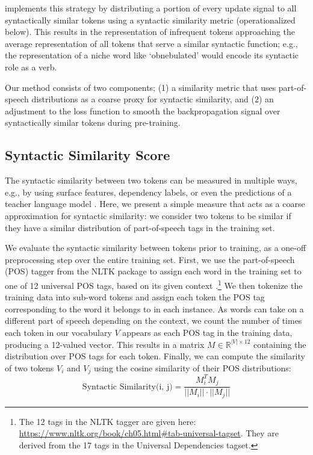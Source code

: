 \smoothing implements this strategy by distributing a portion of every update signal to all syntactically similar tokens using a syntactic similarity metric (operationalized below). This results in the representation of infrequent tokens approaching the average representation of all tokens that serve a similar syntactic function; e.g., the representation of a niche word like `obnebulated' would encode its syntactic role as a verb.

Our method consists of two components; (1) a similarity metric that uses part-of-speech distributions as a coarse proxy for syntactic similarity, and (2) an adjustment to the loss function to smooth the backpropagation signal over syntactically similar tokens during pre-training. 

\subsection{Syntactic Similarity Score}\label{sec:sim}

The syntactic similarity between two tokens can be measured in multiple ways, e.g., by using surface features, dependency labels, or even the predictions of a teacher language model \citep{hinton2015distilling}. Here, we present a simple measure that acts as a coarse approximation for syntactic similarity: we consider two tokens to be similar if they have a similar distribution of part-of-speech tags in the training set.

We evaluate the syntactic similarity between tokens prior to training, as a one-off preprocessing step over the entire training set. First, we use the part-of-speech (POS) tagger from the NLTK package \citep{bird2009natural} to assign each word in the training set to one of 12 universal POS tags, based on its given context \citep{petrov2012universalpos}.\footnote{The 12 tags in the NLTK tagger are given here: \url{https://www.nltk.org/book/ch05.html\#tab-universal-tagset}. They are derived from the 17 tags in the Universal Dependencies tagset.} We then tokenize the training data into sub-word tokens and assign each token the POS tag corresponding to the word it belongs to in each instance. As words can take on a different part of speech depending on the context, we count the number of times each token in our vocabulary $V$ appears as each POS tag in the training data, producing a 12-valued vector. This results in a matrix $M \in \mathbb{R}^{|V|\times 12}$ containing the distribution over POS tags for each token. Finally, we can compute the similarity of two tokens $V_i$ and $V_j$ using the cosine similarity of their POS distributions: $$ \text{Syntactic Similarity(i, j)} = \frac{M_i^TM_j}{||M_i|| \cdot ||M_j||}$$ 


